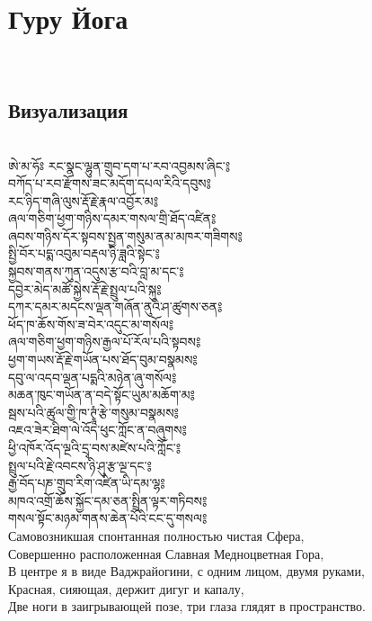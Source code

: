 \section{Гуру Йога}
\\
\subsection{Визуализация}
\\
\ti
ཨེ་མ་ཧོཿ  རང་སྣང་ལྷུན་གྲུབ་དག་པ་རབ་འབྱམས་ཞིང་༔ \\
བཀོད་པ་རབ་རྫོགས་ཟང་མདོག་དཔལ་རིའི་དབུས༔\\
རང་ཉིད་གཞི་ལུས་རྡོ་རྗེ་རྣལ་འབྱོར་མ༔\\
ཞལ་གཅིག་ཕྱག་གཉིས་དམར་གསལ་གྲི་ཐོད་འཛིན༔\\
ཞབས་གཉིས་དོར་སྟབས་སྤྱན་གསུམ་ནམ་མཁར་གཟིགས༔\\
སྤྱི་བོར་པདྨ་འབུམ་བརྡལ་ཉི་ཟླའི་སྟེང་༔\\
སྐྱབས་གནས་ཀུན་འདུས་རྩ་བའི་བླ་མ་དང་༔\\
དབྱེར་མེད་མཚོ་སྐྱེས་རྡོ་རྗེ་སྤྲུལ་པའི་སྐུ༔\\
དཀར་དམར་མདངས་ལྡན་གཞོན་ནུའི་ཤ་ཚུགས་ཅན༔\\
ཕོད་ཁ་ཆོས་གོས་ཟ་བེར་འདུང་མ་གསོལ༔\\
ཞལ་གཅིག་ཕྱག་གཉིས་རྒྱལ་པོ་རོལ་པའི་སྟབས༔\\
ཕྱག་གཡས་རྡོ་རྗེ་གཡོན་པས་ཐོད་བུམ་བསྣམས༔\\
དབུ་ལ་འདབ་ལྡན་པདྨའི་མཉེན་ཞུ་གསོལ༔\\
མཆན་ཁུང་གཡོན་ན་བདེ་སྟོང་ཡུམ་མཆོག་མ༔\\
སྦས་པའི་ཚུལ་གྱི་ཁ་ཊྭཱཾ་རྩེ་གསུམ་བསྣམས༔\\
འཇའ་ཟེར་ཐིག་ལེ་འོད་ཕུང་ཀློང་ན་བཞུགས༔\\
ཕྱི་འཁོར་འོད་ལྔའི་དྲྭ་བས་མཛེས་པའི་ཀློང་༔\\
སྤྲུལ་པའི་རྗེ་འབངས་ཉི་ཤུ་རྩ་ལྔ་དང་༔\\
རྒྱ་བོད་པཎ་གྲུབ་རིག་འཛིན་ཡི་དམ་ལྷ༔\\
མཁའ་འགྲོ་ཆོས་སྐྱོང་དམ་ཅན་སྤྲིན་ལྟར་གཏིབས༔\\
གསལ་སྟོང་མཉམ་གནས་ཆེན་པོའི་ངང་དུ་གསལ༔\\
\ru
\newpage
Самовозникшая спонтанная полностью чистая Сфера,\\
Совершенно расположенная Славная Медноцветная Гора, \\
В центре я в виде Ваджрайогини, с одним лицом, двумя руками,\\
Красная, сияющая, держит дигуг и капалу,\\
Две ноги в заигрывающей позе, три глаза глядят в пространство.\\
